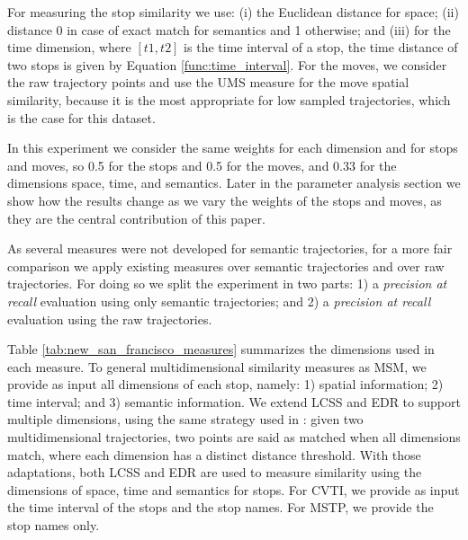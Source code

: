 {For measuring the stop similarity we use: (i) the Euclidean distance for space; (ii)  distance 0 in case of exact match for semantics and 1 otherwise; and (iii) for the time dimension, where $[t1, t2]$ is the time interval of a stop, the time distance of two stops is given by  Equation {\ref{func:time_interval}}. For the moves, we consider the raw trajectory points and use the UMS measure for the move spatial similarity, because it is the most appropriate for low sampled trajectories, which is the case for this dataset.

In this experiment we consider the same weights for each dimension and for stops and moves, so 0.5 for the stops and 0.5 for the moves, and 0.33 for the dimensions space, time, and semantics. Later in the parameter analysis section we show how the results change as we vary the weights of the stops and moves, as they are the central contribution of this paper.

As several measures were not developed for semantic trajectories, for a more fair comparison we apply existing measures over semantic trajectories and over raw trajectories. For doing so we split the experiment in two parts: 1) a \textit{precision at recall} evaluation using only semantic trajectories; and 2) a \textit{precision at recall} evaluation using the raw trajectories.}

{Table {\ref{tab:new_san_francisco_measures}} summarizes the dimensions used in each measure. To general multidimensional similarity measures as MSM, we provide as input all dimensions of each stop, namely: 1) spatial information; 2) time interval; and 3) semantic information. We extend LCSS and EDR to support multiple dimensions, using the same strategy used in }\cite{Furtado:TGIS12156}{: given two multidimensional trajectories, two points are said as matched when all dimensions match, where each dimension has a distinct distance threshold. With those adaptations, both LCSS and EDR are used to measure similarity using the dimensions of space, time and semantics for stops. For CVTI, we provide as input the time interval of the stops and the stop names. For MSTP, we provide the stop names only.}

